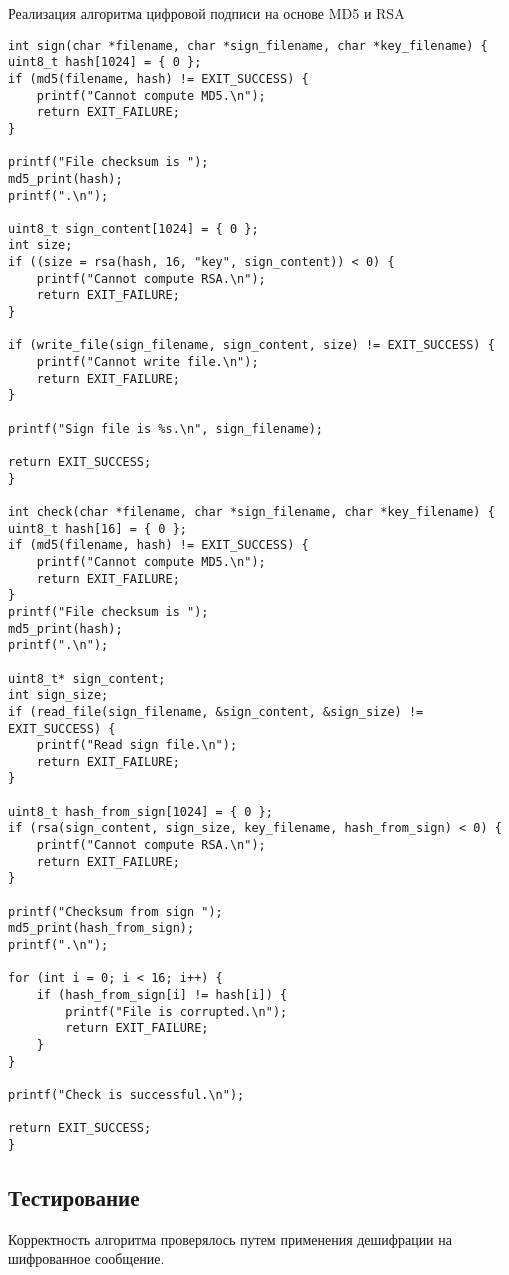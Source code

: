 \begin{listing}[!h]
	\caption{Реализация алгоритма цифровой подписи на основе MD5 и RSA}
	\begin{verbatim}
int sign(char *filename, char *sign_filename, char *key_filename) {
uint8_t hash[1024] = { 0 };
if (md5(filename, hash) != EXIT_SUCCESS) {
	printf("Cannot compute MD5.\n");
	return EXIT_FAILURE;
}

printf("File checksum is ");
md5_print(hash);
printf(".\n");

uint8_t sign_content[1024] = { 0 };
int size;
if ((size = rsa(hash, 16, "key", sign_content)) < 0) {
	printf("Cannot compute RSA.\n");
	return EXIT_FAILURE;
}

if (write_file(sign_filename, sign_content, size) != EXIT_SUCCESS) {
	printf("Cannot write file.\n");
	return EXIT_FAILURE;
}

printf("Sign file is %s.\n", sign_filename);

return EXIT_SUCCESS;
}

int check(char *filename, char *sign_filename, char *key_filename) {
uint8_t hash[16] = { 0 };
if (md5(filename, hash) != EXIT_SUCCESS) {
	printf("Cannot compute MD5.\n");
	return EXIT_FAILURE;
}
printf("File checksum is ");
md5_print(hash);
printf(".\n");

uint8_t* sign_content;
int sign_size;
if (read_file(sign_filename, &sign_content, &sign_size) != EXIT_SUCCESS) {
	printf("Read sign file.\n");
	return EXIT_FAILURE;
}

uint8_t hash_from_sign[1024] = { 0 };
if (rsa(sign_content, sign_size, key_filename, hash_from_sign) < 0) {
	printf("Cannot compute RSA.\n");
	return EXIT_FAILURE;
}

printf("Checksum from sign ");
md5_print(hash_from_sign);
printf(".\n");

for (int i = 0; i < 16; i++) {
	if (hash_from_sign[i] != hash[i]) {
		printf("File is corrupted.\n");
		return EXIT_FAILURE;
	}
}

printf("Check is successful.\n");

return EXIT_SUCCESS;
}
	\end{verbatim}
\end{listing}

\subsection{Тестирование}

Корректность алгоритма проверялось путем применения дешифрации на шифрованное сообщение.

